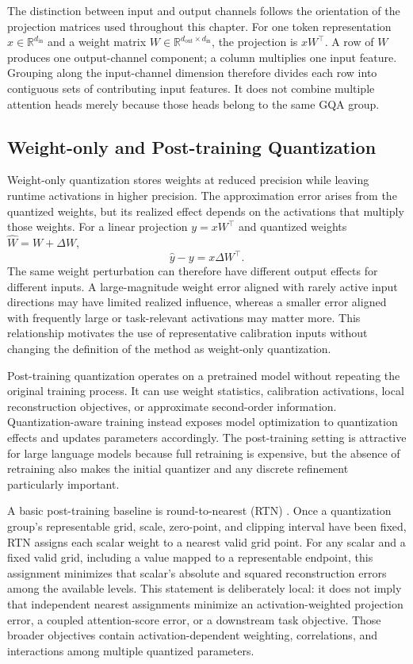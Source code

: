 The distinction between input and output channels follows the orientation of the projection matrices used throughout this chapter. For one token representation $x\in\mathbb{R}^{d_{\mathrm{in}}}$ and a weight matrix $W\in\mathbb{R}^{d_{\mathrm{out}}\times d_{\mathrm{in}}}$, the projection is $xW^\top$. A row of $W$ produces one output-channel component; a column multiplies one input feature. Grouping along the input-channel dimension therefore divides each row into contiguous sets of contributing input features. It does not combine multiple attention heads merely because those heads belong to the same GQA group.

\subsection{Weight-only and Post-training Quantization}

Weight-only quantization stores weights at reduced precision while leaving runtime activations in higher precision. The approximation error arises from the quantized weights, but its realized effect depends on the activations that multiply those weights. For a linear projection $y=xW^\top$ and quantized weights $\hat{W}=W+\Delta W$,
\begin{equation}
\hat{y}-y=x\Delta W^\top.
\end{equation}
The same weight perturbation can therefore have different output effects for different inputs. A large-magnitude weight error aligned with rarely active input directions may have limited realized influence, whereas a smaller error aligned with frequently large or task-relevant activations may matter more. This relationship motivates the use of representative calibration inputs without changing the definition of the method as weight-only quantization.

Post-training quantization operates on a pretrained model without repeating the original training process. It can use weight statistics, calibration activations, local reconstruction objectives, or approximate second-order information. Quantization-aware training instead exposes model optimization to quantization effects and updates parameters accordingly. The post-training setting is attractive for large language models because full retraining is expensive, but the absence of retraining also makes the initial quantizer and any discrete refinement particularly important.

A basic post-training baseline is round-to-nearest (RTN) \cite{gholami2021survey,nagel2021white}. Once a quantization group's representable grid, scale, zero-point, and clipping interval have been fixed, RTN assigns each scalar weight to a nearest valid grid point. For any scalar and a fixed valid grid, including a value mapped to a representable endpoint, this assignment minimizes that scalar's absolute and squared reconstruction errors among the available levels. This statement is deliberately local: it does not imply that independent nearest assignments minimize an activation-weighted projection error, a coupled attention-score error, or a downstream task objective. Those broader objectives contain activation-dependent weighting, correlations, and interactions among multiple quantized parameters.

